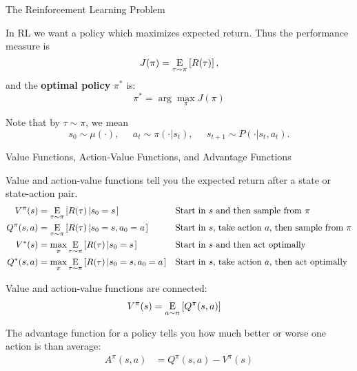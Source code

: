 \begin{frame}{The Reinforcement Learning Problem}

In RL we want a policy which maximizes expected return. Thus the performance measure is
%
\begin{equation*}
J(\pi) = \underset{\begin{subarray}{c}\tau \sim \pi \end{subarray}}{{\mathrm E}}\left[ R(\tau) \right],
\end{equation*}
%
and the \textbf{optimal policy} $\pi^*$ is:
%
\begin{equation*}
\pi^* = \arg \max_{\pi} J(\pi)
\end{equation*}

Note that by $\tau \sim \pi$, we mean
%
\begin{equation*}
s_0 \sim \mu(\cdot), \;\;\;\;\; a_t \sim \pi(\cdot|s_t), \;\;\;\;\; s_{t+1} \sim P(\cdot | s_t, a_t).
\end{equation*}

\end{frame}


\begin{frame}{Value Functions, Action-Value Functions, and Advantage Functions}

Value and action-value functions tell you the expected return after a state or state-action pair.
%
\begin{align*}
V^{\pi}(s) &= \underset{\begin{subarray}{c}\tau \sim \pi \end{subarray}}{{\mathrm E}}\left[ R(\tau)\left| s_0 = s\right. \right] && \text{Start in }s\text{ and then sample from }\pi \\
Q^{\pi}(s,a) &= \underset{\begin{subarray}{c}\tau \sim \pi \end{subarray}}{{\mathrm E}}\left[ R(\tau)\left| s_0 = s, a_0 = a\right. \right] && \text{Start in }s\text{, take action }a\text{, then sample from }\pi \\
V^*(s) &= \max_{\pi} \underset{\begin{subarray}{c}\tau \sim \pi \end{subarray}}{{\mathrm E}}\left[ R(\tau)\left| s_0 = s\right. \right] && \text{Start in }s\text{ and then act optimally} \\
Q^*(s,a) &= \max_{\pi} \underset{\begin{subarray}{c}\tau \sim \pi \end{subarray}}{{\mathrm E}}\left[ R(\tau)\left| s_0 = s, a_0 = a\right. \right] &&\text{Start in }s\text{, take action }a\text{, then act optimally}
\end{align*}

Value and action-value functions are connected:
%
\begin{align*}
V^{\pi}(s) &= \underset{\begin{subarray}{c}a \sim \pi \end{subarray}}{{\mathrm E}}\left[ Q^{\pi}(s,a) \right]
\end{align*}

The advantage function for a policy tells you how much better or worse one action is than average:
%
\begin{align*}
A^{\pi}(s,a) &= Q^{\pi}(s,a) - V^{\pi}(s) 
\end{align*}

\end{frame}

